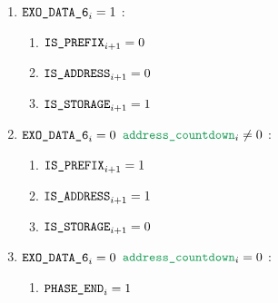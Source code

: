 \begin{enumerate}[resume]
\begin{enumerate}[resume]
\begin{enumerate}
					\item \If $\texttt{EXO\_DATA\_6} _{i} = 1$ \Then:
						\begin{enumerate}
							\item $\texttt{IS\_PREFIX} _{i + 1} = 0$
							\item $\texttt{IS\_ADDRESS}   _{i + 1} = 0$
							\item $\texttt{IS\_STORAGE}    _{i + 1} = 1$
						\end{enumerate}

					\item \If $\texttt{EXO\_DATA\_6} _{i} = 0$ \et $\locAddressPrewarmingCountdown _{i} \neq 0$ \Then:
						\begin{enumerate}
							\item $\texttt{IS\_PREFIX} _{i + 1} = 1$
							\item $\texttt{IS\_ADDRESS}   _{i + 1} = 1$
							\item $\texttt{IS\_STORAGE}    _{i + 1} = 0$
						\end{enumerate}

					\item \If $\texttt{EXO\_DATA\_6} _{i} = 0$ \et $\locAddressPrewarmingCountdown _{i} = 0$ \Then:
						\begin{enumerate}
							\item $\texttt{PHASE\_END} _{i} = 1$
						\end{enumerate}
				\end{enumerate}
		\end{enumerate}


\end{enumerate}
